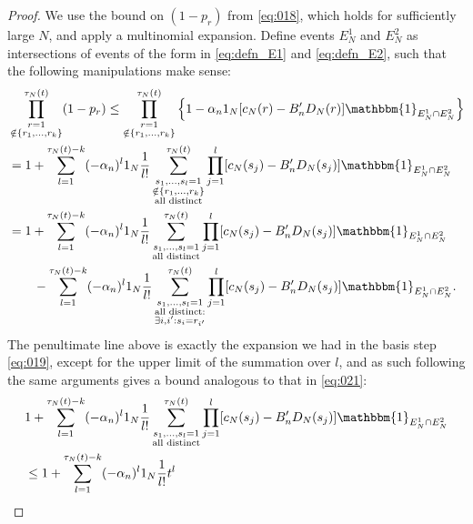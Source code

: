 \documentclass[12pt,authoryear]{article}
\theoremstyle{definition}
\newcommand{\1}[1]{\mathbbm{1}_{#1}}
\newcommand{\ON}{1_N}
\begin{document}
\begin{proof}
We use the bound on $(1-p_r)$ from \eqref{eq:018}, which holds for sufficiently large $N$, and apply a multinomial expansion. Define events $E_N^1$ and $E_N^2$ as intersections of events of the form in \eqref{eq:defn_E1} and \eqref{eq:defn_E2}, such that the following manipulations make sense:
\begin{align}
&\prod_{\substack{r=1 \\ \notin \{r_1,\dots,r_k\} }}^{\tau_N(t)} (1-p_r)
\leq \prod_{\substack{r=1 \\ \notin \{r_1,\dots,r_k\} }}^{\tau_N(t)} 
        \left\{ 1 - \alpha_n  \ON [ c_N(r) - B_n^\prime D_N(r) ] 
        \1{E_N^1 \cap E_N^2} \right\} \notag\\
&= 1 + \sum_{l=1}^{\tau_N(t) -k}
        (-\alpha_n)^l \ON \frac{1}{l!}
        \sum_{\substack{s_1, \dots, s_l =1 \\ \notin \{r_1,\dots,r_k\} 
        \\ \text{all distinct} }}^{\tau_N(t)}
        \prod_{j=1}^l [ c_N(s_j) - B_n^\prime D_N(s_j) ]
        \1{E_N^1 \cap E_N^2} \notag\\
&= 1 + \sum_{l=1}^{\tau_N(t) -k}
        (-\alpha_n)^l \ON \frac{1}{l!}
        \sum_{\substack{ s_1, \dots, s_l =1 \\ \text{all distinct} }}^{\tau_N(t)}
        \prod_{j=1}^l [ c_N(s_j) - B_n^\prime D_N(s_j) ] \1{E_N^1 \cap E_N^2} \notag\\
    &\qquad- \sum_{l=1}^{\tau_N(t) -k}
        (-\alpha_n)^l \ON \frac{1}{l!}
        \sum_{\substack{s_1, \dots, s_l =1 \\ \text{all distinct}: 
        \\ \exists i,i^\prime : s_i=r_{i^\prime} }}^{\tau_N(t)} 
        \prod_{j=1}^l [ c_N(s_j) - B_n^\prime D_N(s_j) ]
        \1{E_N^1 \cap E_N^2} . \label{eq:031}
\end{align}
The penultimate line above is exactly the expansion we had in the basis step \eqref{eq:019}, except for the upper limit of the summation over $l$, and as such following the same arguments gives a bound analogous to that in \eqref{eq:021}:
\begin{align*}
&1 + \sum_{l=1}^{\tau_N(t) -k}
        (-\alpha_n)^l \ON \frac{1}{l!}
        \sum_{\substack{ s_1, \dots, s_l =1 \\ \text{all distinct} }}^{\tau_N(t)}
        \prod_{j=1}^l [ c_N(s_j) - B_n^\prime D_N(s_j) ] \1{E_N^1 \cap E_N^2} \\
&\leq 1+ \sum_{l=1}^{\tau_N(t) -k} (-\alpha_n)^l \ON \frac{1}{l!} t^l

\end{align*}
\end{proof}
\end{document}
